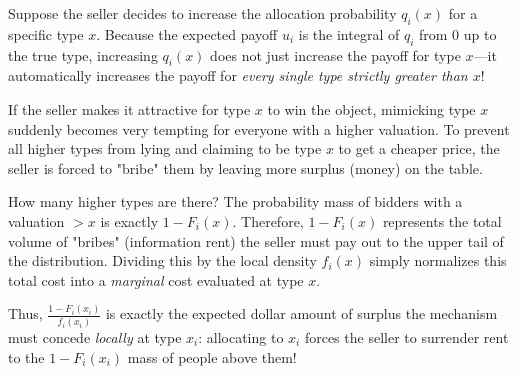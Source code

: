   Suppose the seller decides to increase the allocation probability $q_i(x)$ for a specific type $x$. Because the expected payoff $u_i$ is the integral of $q_i$ from $0$ up to the true type, increasing $q_i(x)$ does not just increase the payoff for type $x$—it automatically increases the payoff for \textit{every single type strictly greater than $x$}! 
  
  If the seller makes it attractive for type $x$ to win the object, mimicking type $x$ suddenly becomes very tempting for everyone with a higher valuation. To prevent all higher types from lying and claiming to be type $x$ to get a cheaper price, the seller is forced to "bribe" them by leaving more surplus (money) on the table. 
  
  How many higher types are there? The probability mass of bidders with a valuation $> x$ is exactly $1 - F_i(x)$. Therefore, $1 - F_i(x)$ represents the total volume of "bribes" (information rent) the seller must pay out to the upper tail of the distribution. Dividing this by the local density $f_i(x)$ simply normalizes this total cost into a \textit{marginal} cost evaluated at type $x$. 
  
  Thus, $\frac{1-F_i(x_i)}{f_i(x_i)}$ is exactly the expected dollar amount of surplus the mechanism must concede \textit{locally} at type $x_i$: allocating to $x_i$ forces the seller to surrender rent to the $1-F_i(x_i)$ mass of people above them!


